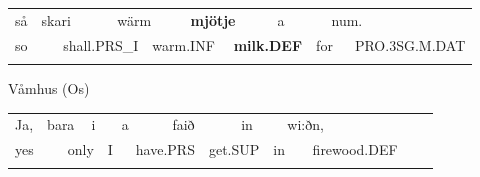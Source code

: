 \begin{tabular}{llllllllllll}
\lsptoprule
så & \multicolumn{2}{l}{skari

} & \multicolumn{2}{l}{wärm

} & \multicolumn{2}{l}{{\bfseries mjötje}

} & \multicolumn{2}{l}{a

} & \multicolumn{2}{l}{num.

} & \\
\multicolumn{2}{l}{so

} & \multicolumn{2}{l}{shall.PRS\_I

} & \multicolumn{2}{l}{warm.INF

} & \multicolumn{2}{l}{{\bfseries milk.DEF}

} & \multicolumn{2}{l}{for

} & \multicolumn{2}{l}{PRO.3SG.M.DAT

}\\
\lspbottomrule
\end{tabular}

\begin{styleExLtrTblii}
Våmhus (Os)

\end{styleExLtrTblii}

\begin{tabular}{llllllllllllllll}
\lsptoprule
Ja, & \multicolumn{2}{l}{bara

} & \multicolumn{2}{l}{i

} & \multicolumn{2}{l}{a

} & \multicolumn{2}{l}{faið

} & \multicolumn{2}{l}{in

} & \multicolumn{2}{l}{wi:ðn,

} & \multicolumn{2}{l}{} & \\
\multicolumn{2}{l}{yes

} & \multicolumn{2}{l}{only

} & \multicolumn{2}{l}{I

} & \multicolumn{2}{l}{have.PRS

} & \multicolumn{2}{l}{get.SUP

} & \multicolumn{2}{l}{in

} & \multicolumn{2}{l}{firewood.DEF

} & \multicolumn{2}{l}{}\\
\lspbottomrule
\end{tabular}


